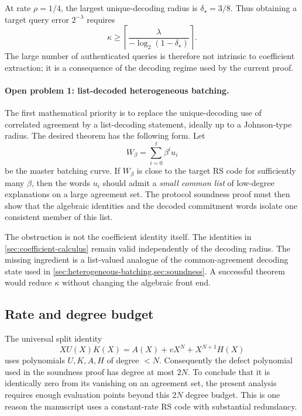At rate $\rho=1/4$, the largest unique-decoding radius is $\delta_\star=3/8$.  Thus obtaining a target query error $2^{-\lambda}$ requires
\begin{equation}
  \kappa
  \ge
  \left\lceil
    \frac{\lambda}{-\log_2(1-\delta_\star)}
  \right\rceil.
  \label{eq:limitations-query-count}
\end{equation}
The large number of authenticated queries is therefore not intrinsic to coefficient extraction; it is a consequence of the decoding regime used by the current proof.

\paragraph{Open problem 1: list-decoded heterogeneous batching.}
The first mathematical priority is to replace the unique-decoding use of correlated agreement by a list-decoding statement, ideally up to a Johnson-type radius.  The desired theorem has the following form.  Let
\[
  W_\beta=\sum_{i=0}^{t}\beta^i u_i
\]
be the master batching curve.  If $W_\beta$ is close to the target RS code for sufficiently many $\beta$, then the words $u_i$ should admit a \emph{small common list} of low-degree explanations on a large agreement set.  The protocol soundness proof must then show that the algebraic identities and the decoded commitment words isolate one consistent member of this list.

The obstruction is not the coefficient identity itself.  The identities in \cref{sec:coefficient-calculus} remain valid independently of the decoding radius.  The missing ingredient is a list-valued analogue of the common-agreement decoding state used in \cref{sec:heterogeneous-batching,sec:soundness}.  A successful theorem would reduce $\kappa$ without changing the algebraic front end.

\subsection{Rate and degree budget}
\label{sec:limitations-rate}

The universal split identity
\[
  XU(X)K(X)=A(X)+vX^N+X^{N+1}H(X)
\]
uses polynomials $U,K,A,H$ of degree $<N$.  Consequently the defect polynomial used in the soundness proof has degree at most $2N$.  To conclude that it is identically zero from its vanishing on an agreement set, the present analysis requires enough evaluation points beyond this $2N$ degree budget.  This is one reason the manuscript uses a constant-rate RS code with substantial redundancy.


